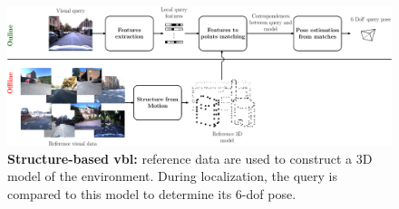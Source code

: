 \begin{figure}[t]
	\centering

	\includegraphics[width=\linewidth]{methods/geometric_method}
	\caption[Structud-based method]{\label{fig:geometric_method}\textbf{Structure-based \acs{vbl}:} reference data are used to construct a 3D model of the environment. During localization, the query is compared to this model to determine its 6-\ac{dof} pose.}
\end{figure}
